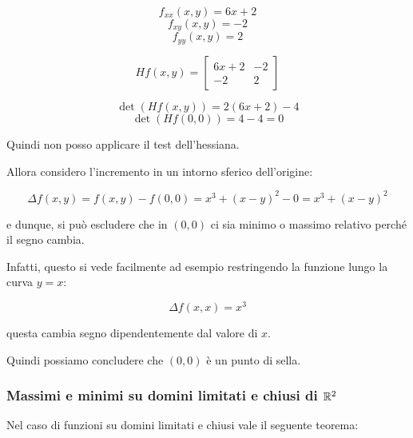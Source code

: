 \[
    f_{xx}(x,y) = 6x+2
\]
\[
    f_{xy}(x,y) = -2
\]
\[
    f_{yy}(x,y) = 2
\]

\[
    H f(x,y) = \begin{bmatrix}
        6x+2 & -2 \\
        -2   & 2
    \end{bmatrix}
\]

\[
    \det(H f(x,y)) = 2(6x+2) - 4
\]
\[
    \det(H f(0,0)) = 4-4 = 0
\]

Quindi non posso applicare il test dell'hessiana.

Allora considero l'incremento in un intorno sferico dell'origine:

\[
    \Delta f(x,y) = f(x,y) - f(0,0) = x^{3}+{(x-y)}^{2} -0 = x^{3}+{(x-y)}^{2}
\]

e dunque, si può escludere che in \((0,0)\) ci sia minimo o massimo relativo perché il segno cambia.

Infatti, questo si vede facilmente ad esempio restringendo la funzione lungo la curva \(y=x\):

\[
    \Delta f(x,x) = x^{3}
\]

questa cambia segno dipendentemente dal valore di \(x\).

Quindi possiamo concludere che \((0,0)\) è un punto di sella.

\pagebreak
\subsubsection{Massimi e minimi su domini limitati e chiusi di \texorpdfstring{\(\mathbb{R}^{2}\)}{R2}}

Nel caso di funzioni su domini limitati e chiusi vale il seguente teorema:

